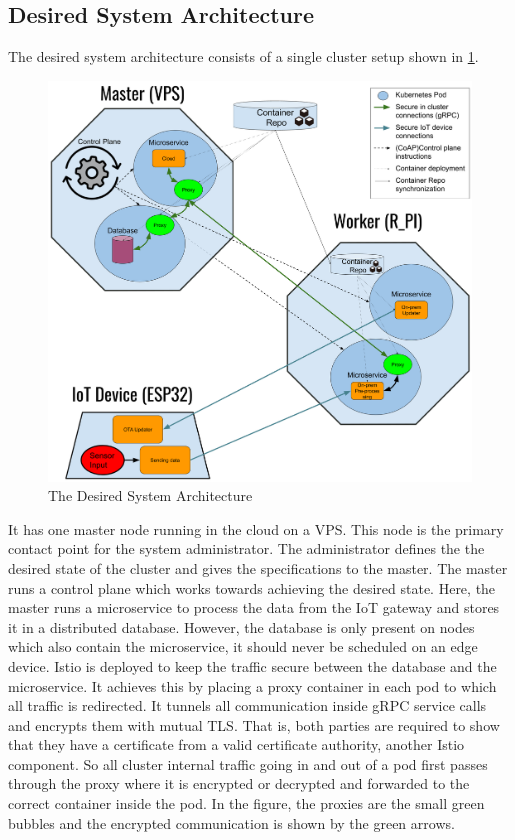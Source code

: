 \subsection{Desired System Architecture} \label{sec:desiredSystem}
The desired system architecture consists of a single cluster setup shown in \cref{fig:implementationSetup}.
\begin{figure}
    \centering
    \includegraphics[scale=0.25]{figures/implementationSetup.png}
    \caption{The Desired System Architecture}
    \label{fig:implementationSetup}
\end{figure}
It has one master node running in the cloud on a VPS. This node is the primary contact point for the system administrator. The administrator defines the the desired state of the cluster and gives the specifications to the master. The master runs a control plane which works towards achieving the desired state. Here, the master runs a microservice to process the data from the IoT gateway and stores it in a distributed database. However, the database is only present on nodes which also contain the microservice, it should never be scheduled on an edge device. Istio is deployed to keep the traffic secure between the database and the microservice. It achieves this by placing a proxy container in each pod to which all traffic is redirected. It tunnels all communication inside gRPC service calls and encrypts them with mutual TLS. That is, both parties are required to show that they have a certificate from a valid certificate authority, another Istio component. So all cluster internal traffic going in and out of a pod first passes through the proxy where it is encrypted or decrypted and forwarded to the correct container inside the pod. In the figure, the proxies are the small green bubbles and the encrypted communication is shown by the green arrows.

